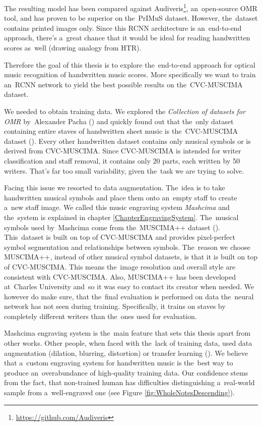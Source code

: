 The resulting model has been compared against Audiveris\footnote{\href{https://github.com/Audiveris}{https://github.com/Audiveris}}, an~open-source OMR tool, and has proven to be superior on the~PrIMuS dataset. However, the~dataset contains printed images only. Since this RCNN architecture is an~end-to-end approach, there's a~great chance that it would be ideal for reading handwritten scores as~well (drawing analogy from HTR).

Therefore the goal of this thesis is to explore the~end-to-end approach for optical music recognition of handwritten music scores. More specifically we want to train an~RCNN network to yield the best possible results on the~CVC-MUSCIMA dataset.

\overfullrule=0pt %
We needed to obtain training data. We explored the \emph{Collection of datasets for OMR} by~Alexander Pacha (\cite{Pacha}) and quickly found out that the~only dataset containing entire staves of handwritten sheet music is the~CVC-MUSCIMA dataset (\cite{CvcMuscima}). Every other handwritten dataset contains only musical symbols or is derived from CVC-MUSCIMA. Since CVC-MUSCIMA is intended for writer classification and staff removal, it contains only 20 parts, each written by 50 writers. That's far too small variability, given the~task we are trying to solve.

Facing this issue we resorted to data augmentation. The~idea is to take handwritten musical symbols and place them onto an~empty staff to create a~new staff image. We called this music engraving system \emph{Mashcima} and the~system is explained in chapter \ref{ChapterEngravingSystem}. The~musical symbols used by~Mashcima come from the~MUSCIMA++ dataset (\cite{MuscimaPP}). This~dataset is built on top of CVC-MUSCIMA and provides pixel-perfect symbol segmentation and relationships between symbols. The~reason we choose MUSCIMA++, instead of other musical symbol datasets, is that it is built on top of CVC-MUSCIMA. This means the~image resolution and overall style are consistent with CVC-MUSCIMA. Also, MUSCIMA++ has been developed at~Charles University and~so it was easy to contact its creator when needed. We however do make sure, that the~final evaluation is performed on data the~neural network has not seen during training. Specifically, it trains on staves by completely different writers than the~ones used for evaluation.

Mashcima engraving system is the~main feature that sets this thesis apart from other works. Other people, when faced with the~lack of training data, used data augmentation (dilation, blurring, distortion) or transfer learning (\cite{HmrBaseline}). We believe that a~custom engraving system for handwritten music is the~best way to produce an~overabundance of high-quality training data. Our confidence stems from the fact, that non-trained human has difficulties distinguishing a~real-world sample from a~well-engraved one (see Figure \ref{fig:WholeNotesDescending}).

